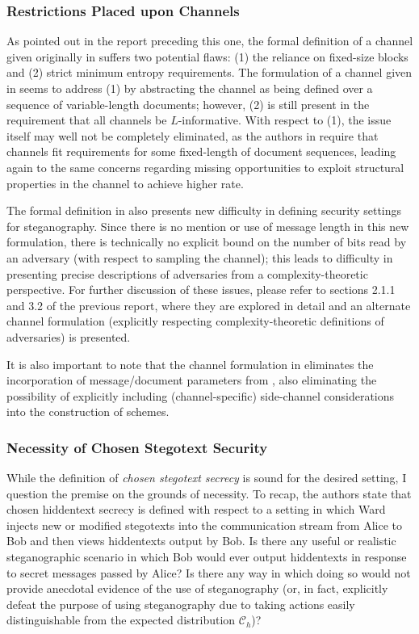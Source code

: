 \documentclass{article}
\begin{document}
\subsubsection{Restrictions Placed upon Channels}

As pointed out in the report preceding this one, the formal definition of a channel given originally in 
\cite{BiglouPSS} suffers two potential flaws: (1) the reliance on fixed-size blocks and (2) strict minimum entropy 
requirements.  The formulation of a channel given in \cite{BiglouPubKey} seems to address (1) by 
abstracting the channel as being defined over a sequence of variable-length documents; however, (2) is 
still present in the requirement that all channels be $L$-informative.  With respect to (1), the issue itself may well
not be completely eliminated, as the authors in \cite{BiglouPubKey} require that channels fit requirements for some fixed-length of document sequences, 
leading again to the same concerns regarding missing opportunities to exploit structural properties in the channel to achieve higher rate.

The formal definition in \cite{BiglouPubKey} also presents new difficulty in defining security settings for steganography.
Since there is no mention or use of message length in this new formulation, there is technically no explicit bound on the 
number of bits read by an adversary (with respect to sampling the channel); this leads to difficulty in presenting precise
descriptions of adversaries from a complexity-theoretic perspective.  For further discussion of these issues, please refer to 
sections 2.1.1 and 3.2 of the previous report, where they are explored in detail and an alternate channel formulation 
(explicitly respecting complexity-theoretic definitions of adversaries) is presented.

It is also important to note that the channel formulation in \cite{BiglouPubKey} eliminates the incorporation of message/document parameters 
from \cite{BiglouPSS}, also eliminating the possibility of explicitly including (channel-specific) side-channel considerations into the construction 
of schemes.

\subsubsection{Necessity of Chosen Stegotext Security}

While the definition of \textit{chosen stegotext secrecy} is sound for the desired setting, I question the premise on the grounds of necessity.
To recap, the authors state that chosen hiddentext secrecy is defined with respect to a setting in which Ward injects new or modified stegotexts 
into the communication stream from Alice to Bob and then views hiddentexts output by Bob.  Is there any useful or realistic steganographic scenario 
in which Bob would ever output hiddentexts in response to secret messages passed by Alice?  Is there any way in which doing so would not provide anecdotal evidence of the use of steganography (or, in fact, explicitly defeat the purpose of using steganography due to taking actions easily distinguishable from 
the expected distribution $\mathcal{C}_h$)?
\end{document}
